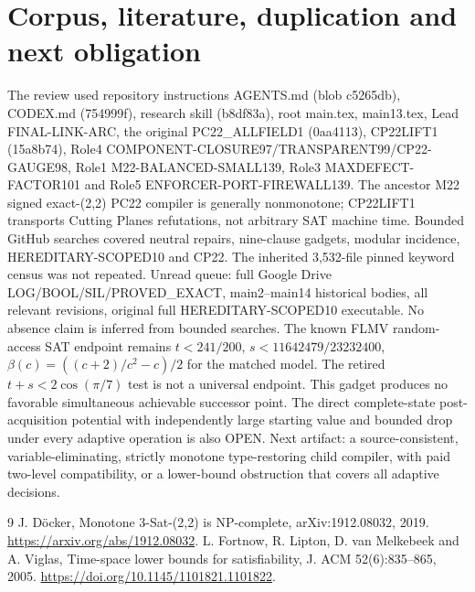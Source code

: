 \documentclass[11pt]{article}
\begin{document}
\section{Corpus, literature, duplication and next obligation}
The review used repository instructions AGENTS.md (blob c5265db), CODEX.md (754999f), research skill (b8df83a), root main.tex, main13.tex, Lead FINAL-LINK-ARC, the original PC22_ALLFIELD1 (0aa4113), CP22LIFT1 (15a8b74), Role4 COMPONENT-CLOSURE97/TRANSPARENT99/CP22-GAUGE98, Role1 M22-BALANCED-SMALL139, Role3 MAXDEFECT-FACTOR101 and Role5 ENFORCER-PORT-FIREWALL139. The ancestor M22 signed exact-(2,2) PC22 compiler is generally nonmonotone; CP22LIFT1 transports Cutting Planes refutations, not arbitrary SAT machine time. Bounded GitHub searches covered neutral repairs, nine-clause gadgets, modular incidence, HEREDITARY-SCOPED10 and CP22. The inherited 3,532-file pinned keyword census was not repeated. Unread queue: full Google Drive LOG/BOOL/SIL/PROVED_EXACT, main2--main14 historical bodies, all relevant revisions, original full HEREDITARY-SCOPED10 executable. No absence claim is inferred from bounded searches.
The known FLMV random-access SAT endpoint remains $t<241/200$, $s<11642479/23232400$, $\beta(c)=((c+2)/c^2-c)/2$ for the matched model. The retired $t+s<2\cos(\pi/7)$ test is not a universal endpoint. This gadget produces no favorable simultaneous achievable successor point. The direct complete-state post-acquisition potential with independently large starting value and bounded drop under every adaptive operation is also OPEN. Next artifact: a source-consistent, variable-eliminating, strictly monotone type-restoring child compiler, with paid two-level compatibility, or a lower-bound obstruction that covers all adaptive decisions.
\begin{thebibliography}{9}
 J. D\"ocker, Monotone 3-Sat-(2,2) is NP-complete, arXiv:1912.08032, 2019. \url{https://arxiv.org/abs/1912.08032}.
 L. Fortnow, R. Lipton, D. van Melkebeek and A. Viglas, Time-space lower bounds for satisfiability, J. ACM 52(6):835--865, 2005. \url{https://doi.org/10.1145/1101821.1101822}.
\end{thebibliography}
\end{document}
